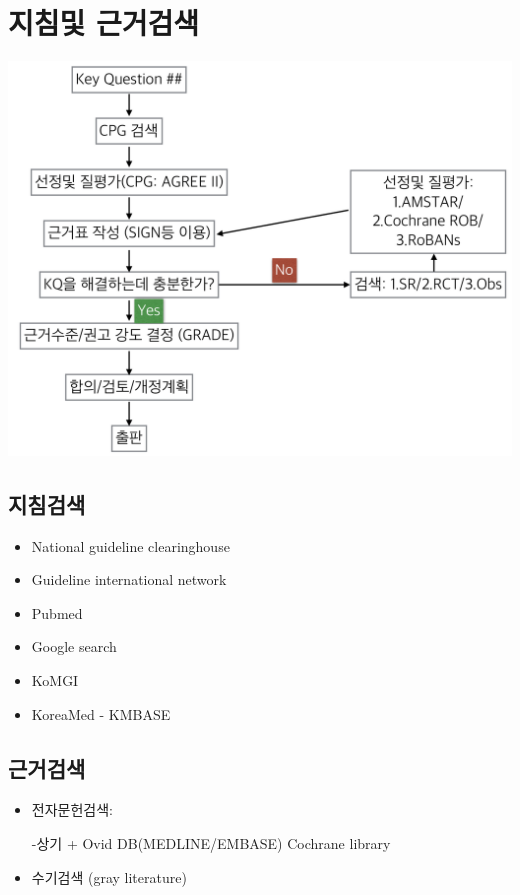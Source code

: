 \documentclass[]{book}
\providecommand{\tightlist}{%
  \setlength{\itemsep}{0pt}\setlength{\parskip}{0pt}}
\begin{document}
\hypertarget{section-21}{%
\chapter{지침및 근거검색}\label{section-21}}

\includegraphics{static/SearchProcess.png}

\hypertarget{section-22}{%
\section{지침검색}\label{section-22}}

\begin{itemize}
\tightlist
\item
  National guideline clearinghouse
\item
  Guideline international network
\item
  Pubmed
\item
  Google search
\item
  KoMGI
\item
  KoreaMed - KMBASE
\end{itemize}

\hypertarget{section-23}{%
\section{근거검색}\label{section-23}}

\begin{itemize}
\item
  전자문헌검색:

  -상기 + Ovid DB(MEDLINE/EMBASE) Cochrane library
\item
  수기검색 (gray literature)
\end{itemize}
\end{document}
